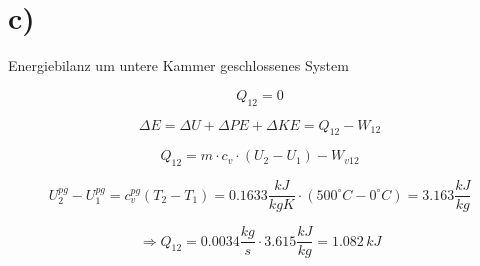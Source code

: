 

\section*{c)}

Energiebilanz um untere Kammer geschlossenes System

\[
Q_{12} = 0
\]

\[
\Delta E = \Delta U + \Delta PE + \Delta KE = Q_{12} - W_{12}
\]

\[
Q_{12} = m \cdot c_v \cdot (U_2 - U_1) - W_{v12}
\]

\[
U_2^{pg} - U_1^{pg} = c_v^{pg} (T_2 - T_1) = 0.1633 \frac{kJ}{kgK} \cdot (500^\circ C - 0^\circ C) = 3.163 \frac{kJ}{kg}
\]

\[
\Rightarrow Q_{12} = 0.0034 \frac{kg}{s} \cdot 3.615 \frac{kJ}{kg} = 1.082 \, kJ
\]